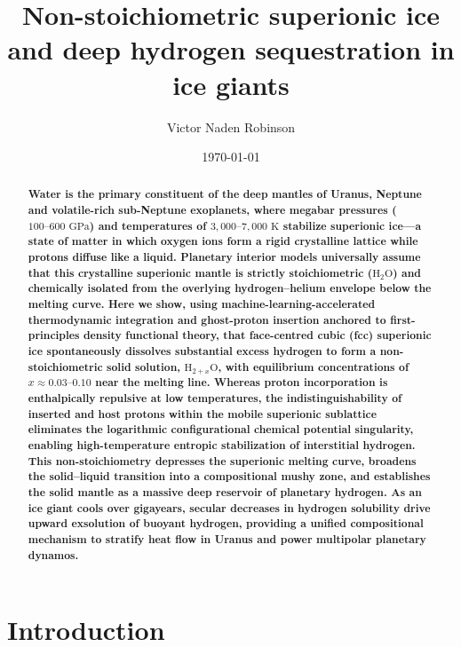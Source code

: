 \documentclass[twocolumn,secnumarabic,amssymb,nobibnotes,aps,prl,superscriptaddress,10pt]{revtex4-2}
\begin{document}
\title{Non-stoichiometric superionic ice and deep hydrogen sequestration in ice giants}

\author{Victor Naden Robinson}

\date{\today}

\begin{abstract}
\noindent\textbf{Water is the primary constituent of the deep mantles of Uranus, Neptune and volatile-rich sub-Neptune exoplanets, where megabar pressures ($100\text{--}600\text{ GPa}$) and temperatures of $3,000\text{--}7,000\text{ K}$ stabilize superionic ice---a state of matter in which oxygen ions form a rigid crystalline lattice while protons diffuse like a liquid. Planetary interior models universally assume that this crystalline superionic mantle is strictly stoichiometric ($\text{H}_2\text{O}$) and chemically isolated from the overlying hydrogen--helium envelope below the melting curve. Here we show, using machine-learning-accelerated thermodynamic integration and ghost-proton insertion anchored to first-principles density functional theory, that face-centred cubic (fcc) superionic ice spontaneously dissolves substantial excess hydrogen to form a non-stoichiometric solid solution, $\text{H}_{2+x}\text{O}$, with equilibrium concentrations of $x \approx 0.03\text{--}0.10$ near the melting line. Whereas proton incorporation is enthalpically repulsive at low temperatures, the indistinguishability of inserted and host protons within the mobile superionic sublattice eliminates the logarithmic configurational chemical potential singularity, enabling high-temperature entropic stabilization of interstitial hydrogen. This non-stoichiometry depresses the superionic melting curve, broadens the solid--liquid transition into a compositional mushy zone, and establishes the solid mantle as a massive deep reservoir of planetary hydrogen. As an ice giant cools over gigayears, secular decreases in hydrogen solubility drive upward exsolution of buoyant hydrogen, providing a unified compositional mechanism to stratify heat flow in Uranus and power multipolar planetary dynamos.}
\end{abstract}

\maketitle

\section*{Introduction}
\end{document}
